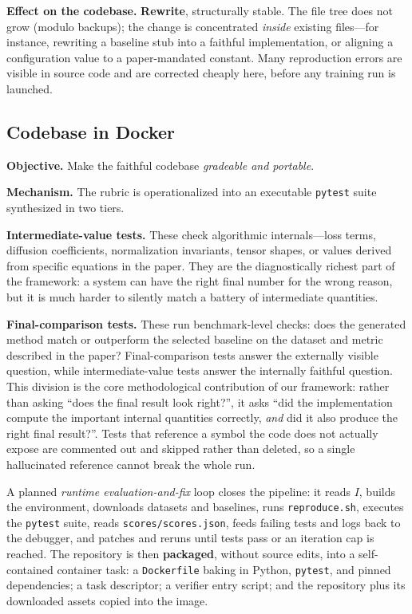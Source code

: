 \documentclass[11pt]{article}
\begin{document}
\textbf{Effect on the codebase.} \textbf{Rewrite}, structurally stable. The file tree does not grow (modulo backups); the change is concentrated \emph{inside} existing files---for instance, rewriting a baseline stub into a faithful implementation, or aligning a configuration value to a paper-mandated constant. Many reproduction errors are visible in source code and are corrected cheaply here, before any training run is launched.

\subsection{Codebase in Docker}

\textbf{Objective.} Make the faithful codebase \emph{gradeable and portable}.

\textbf{Mechanism.} The rubric is operationalized into an executable \texttt{pytest} suite synthesized in two tiers.

\textbf{Intermediate-value tests.} These check algorithmic internals---loss terms, diffusion coefficients, normalization invariants, tensor shapes, or values derived from specific equations in the paper. They are the diagnostically richest part of the framework: a system can have the right final number for the wrong reason, but it is much harder to silently match a battery of intermediate quantities.

\textbf{Final-comparison tests.} These run benchmark-level checks: does the generated method match or outperform the selected baseline on the dataset and metric described in the paper? Final-comparison tests answer the externally visible question, while intermediate-value tests answer the internally faithful question. This division is the core methodological contribution of our framework: rather than asking ``does the final result look right?'', it asks ``did the implementation compute the important internal quantities correctly, \emph{and} did it also produce the right final result?''. Tests that reference a symbol the code does not actually expose are commented out and skipped rather than deleted, so a single hallucinated reference cannot break the whole run.

A planned \emph{runtime evaluation-and-fix} loop closes the pipeline: it reads $I$, builds the environment, downloads datasets and baselines, runs \texttt{reproduce.sh}, executes the \texttt{pytest} suite, reads \texttt{scores/scores.json}, feeds failing tests and logs back to the debugger, and patches and reruns until tests pass or an iteration cap is reached. The repository is then \textbf{packaged}, without source edits, into a self-contained container task: a \texttt{Dockerfile} baking in Python, \texttt{pytest}, and pinned dependencies; a task descriptor; a verifier entry script; and the repository plus its downloaded assets copied into the image.
\end{document}
